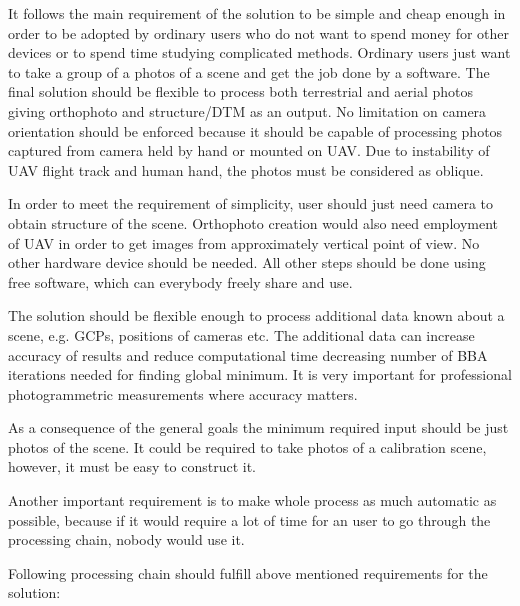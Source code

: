 \documentclass[a4paper,12pt]{article}
\begin{document}

It follows the main requirement 
of the solution to be simple and cheap enough
in order to be adopted by
ordinary users who do not want 
to spend money for other devices or to spend time studying complicated methods. 
Ordinary users just 
want to take a group of a photos of a scene and get the job done by a software.
The final solution should be flexible to process both terrestrial and aerial photos
giving orthophoto and structure/DTM as an output. 
No limitation on camera orientation should be enforced because it should be capable 
of processing photos captured from camera held by hand or mounted on UAV.
Due to instability of UAV flight track and human hand, the photos 
must be considered as oblique. 


In order to meet the requirement of simplicity, user should just need  
 camera to obtain structure of the scene. Orthophoto creation would also need employment of UAV
in order to get images from approximately vertical point of view.
No other hardware device should be needed. 
All other steps should be done 
using free software, which can everybody freely share and use. 


The solution should be flexible enough to process additional data known about a scene, 
e.g. GCPs, positions of cameras etc. The additional data can
 increase accuracy of results and reduce computational time  
 decreasing number of  BBA iterations needed for finding global minimum. It is very important 
 for professional photogrammetric measurements where accuracy matters.

As a consequence of the general goals the minimum required input should be just photos
of the scene.
It could be required to take photos of a calibration scene, however, 
it must be easy to construct it. 

Another important requirement is to make whole process as much automatic as possible, 
because if it would require a lot of time for an user to go through the processing chain, nobody would use it.

Following processing chain  \cite{labe2006automatic} should fulfill above mentioned requirements for the solution:
\end{document}
